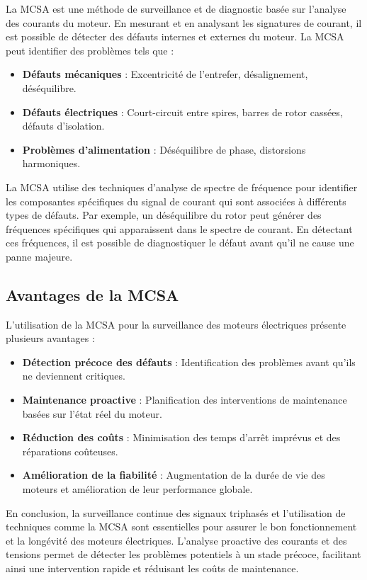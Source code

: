 La MCSA est une méthode de surveillance et de diagnostic basée sur l'analyse
des courants du moteur. En mesurant et en analysant les signatures de courant,
il est possible de détecter des défauts internes et externes du moteur. La MCSA
peut identifier des problèmes tels que :
\begin{itemize}
	\item \textbf{Défauts mécaniques} : Excentricité de l'entrefer, désalignement, déséquilibre.
	\item \textbf{Défauts électriques} : Court-circuit entre spires, barres de rotor cassées, défauts d'isolation.
	\item \textbf{Problèmes d'alimentation} : Déséquilibre de phase, distorsions harmoniques.
\end{itemize}

La MCSA utilise des techniques d'analyse de spectre de fréquence pour
identifier les composantes spécifiques du signal de courant qui sont associées
à différents types de défauts. Par exemple, un déséquilibre du rotor peut
générer des fréquences spécifiques qui apparaissent dans le spectre de courant.
En détectant ces fréquences, il est possible de diagnostiquer le défaut avant
qu'il ne cause une panne majeure.

\subsection*{Avantages de la MCSA}

L'utilisation de la MCSA pour la surveillance des moteurs électriques présente
plusieurs avantages :
\begin{itemize}
	\item \textbf{Détection précoce des défauts} : Identification des problèmes avant qu'ils ne deviennent critiques.
	\item \textbf{Maintenance proactive} : Planification des interventions de maintenance basées sur l'état réel du moteur.
	\item \textbf{Réduction des coûts} : Minimisation des temps d'arrêt imprévus et des réparations coûteuses.
	\item \textbf{Amélioration de la fiabilité} : Augmentation de la durée de vie des moteurs et amélioration de leur performance globale.
\end{itemize}

En conclusion, la surveillance continue des signaux triphasés et l'utilisation
de techniques comme la MCSA sont essentielles pour assurer le bon
fonctionnement et la longévité des moteurs électriques. L'analyse proactive des
courants et des tensions permet de détecter les problèmes potentiels à un stade
précoce, facilitant ainsi une intervention rapide et réduisant les coûts de
maintenance.

